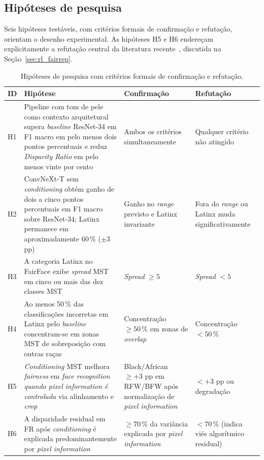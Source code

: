 \subsection{Hipóteses de pesquisa}
\label{sec:hipoteses}

Seis hipóteses testáveis, com critérios formais de confirmação e refutação, orientam o desenho experimental. As hipóteses H5 e H6 endereçam explicitamente a refutação central da literatura recente~\autocite{pangelinan2023exploring}, discutida na Seção~\ref{sec:rl_fairrep}.

\begin{table}[htbp]
\centering
\small
\begin{tabular}{p{0.5cm}p{5.5cm}p{4cm}p{4cm}}
\toprule
\textbf{ID} & \textbf{Hipótese} & \textbf{Confirmação} & \textbf{Refutação} \\
\midrule
H1 & Pipeline com tom de pele como contexto arquitetural supera \emph{baseline} ResNet-34 em F1 macro em pelo menos dois pontos percentuais e reduz \emph{Disparity Ratio} em pelo menos vinte por cento & Ambos os critérios simultaneamente & Qualquer critério não atingido \\
H2 & ConvNeXt-T sem \emph{conditioning} obtém ganho de dois a cinco pontos percentuais em F1 macro sobre ResNet-34; Latinx permanece em aproximadamente 60\,\% ($\pm$3 pp) & Ganho no \emph{range} previsto e Latinx invariante & Fora do \emph{range} ou Latinx muda significativamente \\
H3 & A categoria Latinx no FairFace exibe \emph{spread} MST em cinco ou mais das dez classes MST & \emph{Spread} $\geq 5$ & \emph{Spread} $< 5$ \\
H4 & Ao menos 50\,\% das classificações incorretas em Latinx pelo \emph{baseline} concentram-se em zonas MST de sobreposição com outras raças & Concentração $\geq 50\,\%$ em zonas de \emph{overlap} & Concentração $< 50\,\%$ \\
H5 & \emph{Conditioning} MST melhora \emph{fairness} em \emph{face recognition} \emph{quando pixel information é controlada} via alinhamento e \emph{crop} & Black/African $\geq +3$ pp em RFW/BFW após normalização de \emph{pixel information} & $< +3$ pp ou degradação \\
H6 & A disparidade residual em FR após \emph{conditioning} é explicada predominantemente por \emph{pixel information} & $\geq 70\,\%$ da variância explicada por \emph{pixel information} & $< 70\,\%$ (indica viés algorítmico residual) \\
\bottomrule
\end{tabular}
\caption{Hipóteses de pesquisa com critérios formais de confirmação e refutação.}
\label{tab:hipoteses}
\end{table}

